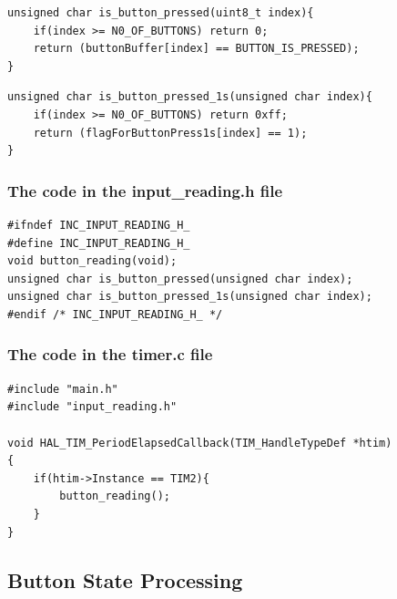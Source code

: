 

\begin{lstlisting}[caption=Checking a button is pressed or not]
unsigned char is_button_pressed(uint8_t index){
	if(index >= N0_OF_BUTTONS) return 0;
	return (buttonBuffer[index] == BUTTON_IS_PRESSED);
}
\end{lstlisting}
\begin{lstlisting}[caption=Checking a button is pressed more than a second or not]
unsigned char is_button_pressed_1s(unsigned char index){
	if(index >= N0_OF_BUTTONS) return 0xff;
	return (flagForButtonPress1s[index] == 1);
}
\end{lstlisting}
\subsubsection{The code in the input\_reading.h file}
\begin{lstlisting}[caption=Prototype in input\_reading.h file]
#ifndef INC_INPUT_READING_H_
#define INC_INPUT_READING_H_
void button_reading(void);
unsigned char is_button_pressed(unsigned char index);
unsigned char is_button_pressed_1s(unsigned char index);
#endif /* INC_INPUT_READING_H_ */
\end{lstlisting}

\subsubsection{The code in the timer.c file}
\begin{lstlisting}[caption=Timer interrupt callback function]
#include "main.h"
#include "input_reading.h"

void HAL_TIM_PeriodElapsedCallback(TIM_HandleTypeDef *htim)
{
	if(htim->Instance == TIM2){
		button_reading();
	}
}

\end{lstlisting}



\newpage
\subsection{Button State Processing}

